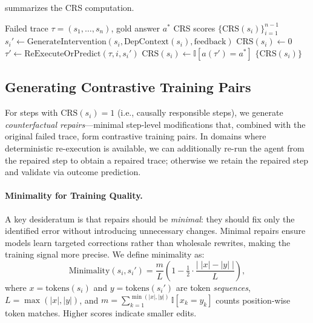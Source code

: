 \documentclass{article}
\theoremstyle{plain}
\theoremstyle{definition}
\theoremstyle{remark}
\begin{document}
 summarizes the CRS computation.

\begin{algorithm}[tb]
   \caption{Causal Responsibility Scoring}
   \label{alg:crs}
\begin{algorithmic}
    Failed trace $\tau = (s_1, \ldots, s_n)$, gold answer $a^*$
    CRS scores $\{\text{CRS}(s_i)\}_{i=1}^{n-1}$
   \STATE $s_i' \leftarrow \text{GenerateIntervention}(s_i, \text{DepContext}(s_i), \text{feedback})$
   \STATE $\text{CRS}(s_i) \leftarrow 0$ 
   \ELSE
   \STATE $\tau' \leftarrow \text{ReExecuteOrPredict}(\tau, i, s_i')$
   \STATE $\text{CRS}(s_i) \leftarrow \mathbb{I}[a(\tau') = a^*]$
   \ENDIF
   \ENDFOR
    $\{\text{CRS}(s_i)\}$
\end{algorithmic}
\end{algorithm}

\subsection{Generating Contrastive Training Pairs}

For steps with $\text{CRS}(s_i) = 1$ (i.e., causally responsible steps), we generate \emph{counterfactual repairs}---minimal step-level modifications that, combined with the original failed trace, form contrastive training pairs. In domains where deterministic re-execution is available, we can additionally re-run the agent from the repaired step to obtain a repaired trace; otherwise we retain the repaired step and validate via outcome prediction.

\paragraph{Minimality for Training Quality.}
A key desideratum is that repairs should be \emph{minimal}: they should fix only the identified error without introducing unnecessary changes. Minimal repairs ensure models learn targeted corrections rather than wholesale rewrites, making the training signal more precise. We define minimality as:
\begin{equation}
    \text{Minimality}(s_i, s_i') =
    \frac{m}{L}\left(1 - \tfrac{1}{2}\cdot\frac{\left|\;|x|-|y|\;\right|}{L}\right),
\end{equation}
where $x=\text{tokens}(s_i)$ and $y=\text{tokens}(s_i')$ are token \emph{sequences}, $L=\max(|x|,|y|)$, and $m=\sum_{k=1}^{\min(|x|,|y|)} \mathbb{I}[x_k = y_k]$ counts position-wise token matches. Higher scores indicate smaller edits.
\end{document}

